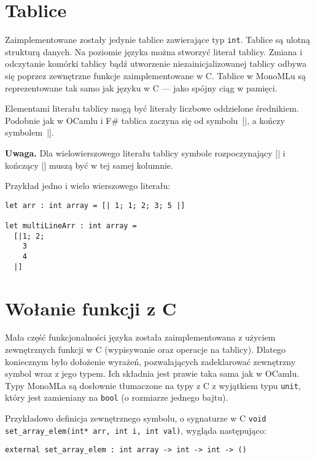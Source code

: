 \documentclass[declaration,shortabstract]{iithesis}
\begin{document}

\section{Tablice}

Zaimplementowane zostały jedynie tablice zawierające typ \texttt{int}. 
Tablice są ulotną strukturą danych. Na poziomie języka można
 stworzyć literał 
tablicy. Zmiana i odczytanie komórki tablicy bądź utworzenie niezainicjalizowanej 
tablicy odbywa się poprzez zewnętrzne funkcje zaimplementowane w C. 
Tablice w MonoMLu są reprezentowane tak samo jak języku w C --- jako spójny
ciąg w pamięci.

Elementami literału tablicy mogą być literały liczbowe oddzielone średnikiem. 
Podobnie jak w OCamlu i F\# tablica zaczyna się od symbolu~$[|$, a 
kończy symbolem~$|]$.

\textbf{Uwaga.} Dla wielowierszowego literału tablicy symbole rozpoczynający 
$[|$ i kończący $|]$ muszą być w tej samej kolumnie.

\pagebreak
Przykład jedno i wielo wierszowego literału:
\begin{lstlisting}[frame=lines]
let arr : int array = [| 1; 1; 2; 3; 5 |]

let multiLineArr : int array = 
  [|1; 2;
    3
    4
  |]
\end{lstlisting}

\section{Wołanie funkcji z C}

Mała część funkcjonalności języka została zaimplementowana z użyciem 
zewnętrznych funkcji w C (wypisywanie oraz operacje na tablicy). Dlatego 
koniecznym było dołożenie wyrażeń, pozwalających zadeklarować zewnętrzny symbol 
wraz z jego typem. Ich składnia jest prawie taka sama jak w OCamlu.
Typy MonoMLa są dosłownie tłumaczone na typy z C z wyjątkiem typu \texttt{unit}, 
który jest zamieniany na \texttt{bool} (o rozmiarze jednego bajtu).

Przykładowo definicja zewnętrznego symbolu, o sygnaturze w C \newline 
\texttt{void set\_array\_elem(int* arr, int i, int val)}, wygląda następująco: 

\begin{lstlisting}[frame=lines]
external set_array_elem : int array -> int -> int -> () 
\end{lstlisting}
\end{document}
